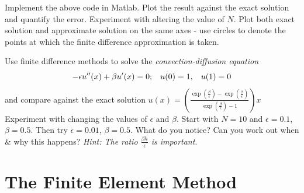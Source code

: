 \documentclass[12pt]{report}
\begin{document}
\begin{itemize}
\begin{tcolorbox}[title=Task]
Implement the above code in Matlab. Plot the result against the exact solution and quantify the error. Experiment with altering the value of $N$. Plot both exact solution and approximate solution on the same axes - use circles to denote the points at which the finite difference approximation is taken.
\end{tcolorbox}

\begin{tcolorbox}[title=Task]
Use finite difference methods to solve the \textit{convection-diffusion equation}
\begin{displaymath}
-\epsilon u''(x) + \beta u'(x) = 0; \hspace{3mm} u(0) = 1, \hspace{3mm} u(1) = 0
\end{displaymath}
and compare against the exact solution $u(x) = \left(\frac{\exp\left(\frac{\beta}{\epsilon}\right)-\exp\left(\frac{\beta}{\epsilon}\right)}{\exp\left(\frac{\beta}{\epsilon}\right)-1}\right)x$
\tcblower
Experiment with changing the values of $\epsilon$ and $\beta$. Start with $N=10$ and $\epsilon = 0.1$, $\beta = 0.5$. Then try $\epsilon = 0.01$, $\beta = 0.5$. What do you notice? Can you work out when \& why this happens? \textit{Hint: The ratio $\frac{\beta h}{\epsilon}$ is important}.
\end{tcolorbox}

\end{itemize}

\clearpage 

\section*{The Finite Element Method}

\newtheorem{theorem}{Definition}[section]
\newtheorem{proposition}{Proposition}[section]
\end{document}
